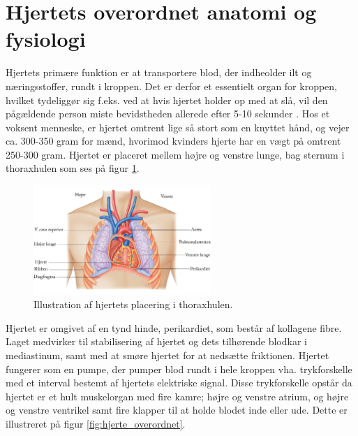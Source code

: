 \section{Hjertets overordnet anatomi og fysiologi}\label{Hjerte_ana_fys}

Hjertets primære funktion er at transportere blod, der indheolder ilt og næringsstoffer, rundt i kroppen. Det er derfor et essentielt organ for kroppen, hvilket tydeliggør sig f.eks. ved at hvis hjertet holder op med at slå, vil den pågældende person miste bevidstheden allerede efter 5-10 sekunder \cite{gronanatomi}. Hos et voksent menneske, er hjertet omtrent lige så stort som en knyttet hånd, og vejer ca. 300-350 gram for mænd, hvorimod kvinders hjerte har en vægt på omtrent 250-300 gram. Hjertet er placeret mellem højre og venstre lunge, bag sternum i thoraxhulen som ses på figur \ref{fig:hjerte_placering}. 

\begin{figure}[H] %
\begin{center}
\includegraphics[width=0.6\textwidth]{figures/thorax.png}
\end{center}
\caption{Illustration af hjertets placering i thoraxhulen. \cite{cindy}}
\label{fig:hjerte_placering}
\end{figure}

\noindent Hjertet er omgivet af en tynd hinde, perikardiet, som består af kollagene fibre. Laget medvirker til stabilisering af hjertet og dets tilhørende blodkar i mediastinum, samt med at smøre hjertet for at nedsætte friktionen. Hjertet fungerer som en pumpe, der pumper blod rundt i hele kroppen vha. trykforskelle med et interval bestemt af hjertets elektriske signal. Disse trykforskelle opstår da hjertet er et hult muskelorgan med fire kamre; højre og venstre atrium, og højre og venstre ventrikel samt fire klapper til at holde blodet inde eller ude. Dette er illustreret på figur \ref{fig:hjerte_overordnet}. 

